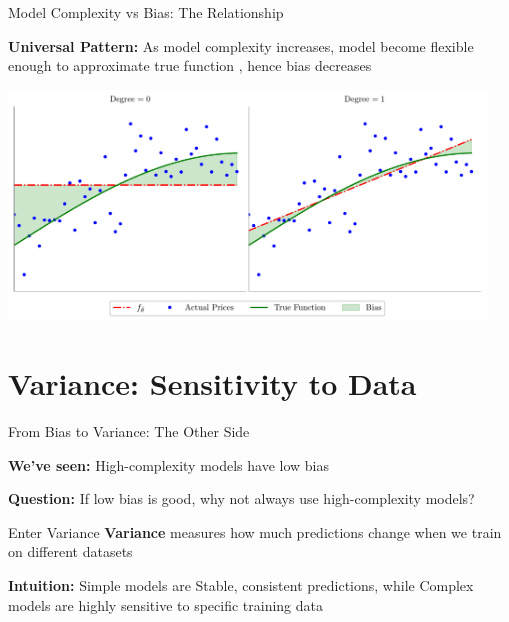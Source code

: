 \documentclass[10pt]{beamer}
\newcommand{\fitpic}[1]{\begin{adjustbox}{max width=\linewidth, max totalheight=0.78\textheight}#1\end{adjustbox}}
\begin{document}
\begin{frame}{Model Complexity vs Bias: The Relationship}
\begin{keypointsbox}
\textbf{Universal Pattern:} As model complexity increases, model become flexible enough  to  approximate true function , hence  bias decreases

\end{keypointsbox}

\begin{center}
\fitpic{\includegraphics[width=0.95\textwidth]{../assets/bias-variance/figures/bias7.pdf}}
\end{center}


\end{frame}

\section{Variance: Sensitivity to Data}

\begin{frame}{From Bias to Variance: The Other Side}
\begin{alertbox}
\textbf{We've seen:} High-complexity models have low bias

\textbf{Question:} If low bias is good, why not always use high-complexity models?
\end{alertbox}

\begin{definitionbox}{Enter Variance}
\textbf{Variance} measures how much predictions change when we train on different datasets
\end{definitionbox}

\begin{keypointsbox}
\textbf{Intuition:} Simple models  are Stable, consistent predictions, while Complex models are highly sensitive to specific training data

\end{keypointsbox}


\end{frame}
\end{document}
